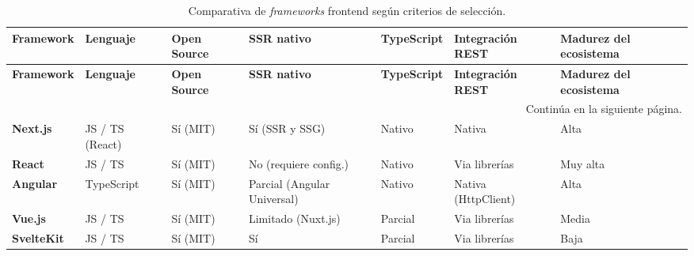 \begin{center}
	\setlength{\tabcolsep}{4pt}
	\begin{longtable}{|p{2cm}|p{1.8cm}|p{1.3cm}|p{1.5cm}|p{1.8cm}|p{2cm}|p{2.2cm}|}
		\caption{Comparativa de \textit{frameworks} frontend según criterios de selección.}
		\label{tab:frameworks-frontend} \\
		
		\hline
		\small\textbf{Framework} &
		\small\textbf{Lenguaje} &
		\small\textbf{Open Source} &
		\small\textbf{SSR nativo} &
		\small\textbf{TypeScript} &
		\small\textbf{Integración REST} &
		\small\textbf{Madurez del ecosistema} \\
		\hline
		\endfirsthead
		
		\hline
		\small\textbf{Framework} &
		\small\textbf{Lenguaje} &
		\small\textbf{Open Source} &
		\small\textbf{SSR nativo} &
		\small\textbf{TypeScript} &
		\small\textbf{Integración REST} &
		\small\textbf{Madurez del ecosistema} \\
		\hline
		\endhead
		
		\hline
		\multicolumn{7}{r}{\small Continúa en la siguiente página.} \\
		\endfoot
		
		\hline
		\endlastfoot
		
		\small\textbf{Next.js}~\cite{nextjs}
		& \small JS / TS (React)
		& \small Sí (MIT)
		& \small Sí (SSR y SSG)
		& \small Nativo
		& \small Nativa
		& \small Alta \\
		\hline
		
		\small\textbf{React}~\cite{react}
		& \small JS / TS
		& \small Sí (MIT)
		& \small No (requiere config.)
		& \small Nativo
		& \small Via librerías
		& \small Muy alta \\
		\hline
		
		\small\textbf{Angular}~\cite{angular}
		& \small TypeScript
		& \small Sí (MIT)
		& \small Parcial (Angular Universal)
		& \small Nativo
		& \small Nativa (HttpClient)
		& \small Alta \\
		\hline
		
		\small\textbf{Vue.js}~\cite{vuejs}
		& \small JS / TS
		& \small Sí (MIT)
		& \small Limitado (Nuxt.js)
		& \small Parcial
		& \small Via librerías
		& \small Media \\
		\hline
		
		\small\textbf{SvelteKit}~\cite{sveltekit}
		& \small JS / TS
		& \small Sí (MIT)
		& \small Sí
		& \small Parcial
		& \small Via librerías
		& \small Baja \\
		\hline
		
	\end{longtable}
\end{center}

